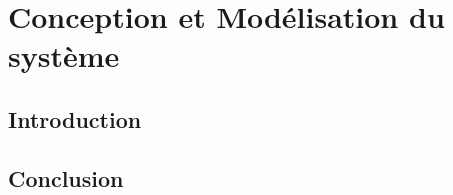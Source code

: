 \chapter{Conception et Modélisation du système}
    \section*{Introduction}
    \section*{Conclusion}